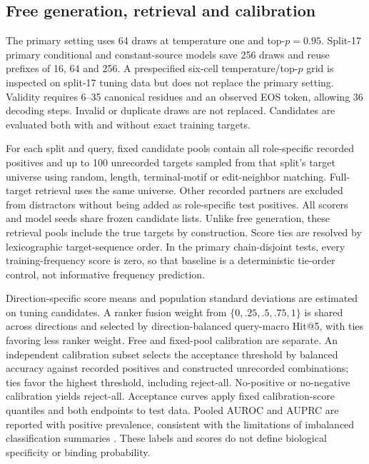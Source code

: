 \documentclass[10pt]{article}
\begin{document}
\subsection{Free generation, retrieval and calibration}
The primary setting uses 64 draws at temperature one and top-$p=0.95$.
Split-17 primary conditional and constant-source models save 256 draws and
reuse prefixes of 16, 64 and 256. A prespecified six-cell temperature/top-$p$
grid is inspected on split-17 tuning data but does not replace the primary
setting. Validity requires 6--35 canonical residues and an observed EOS token,
allowing 36 decoding steps. Invalid or duplicate draws are not replaced.
Candidates are evaluated both with and without exact training targets.

For each split and query, fixed candidate pools contain all role-specific
recorded positives and up to 100 unrecorded targets sampled from that split's
target universe using random, length, terminal-motif or edit-neighbor matching.
Full-target retrieval uses the same universe. Other recorded partners are
excluded from distractors without being added as role-specific test positives.
All scorers and model seeds share frozen candidate lists. Unlike free generation,
these retrieval pools include the true targets by construction.
Score ties are resolved by lexicographic target-sequence order. In the primary
chain-disjoint tests, every training-frequency score is zero, so that baseline
is a deterministic tie-order control, not informative frequency prediction.

Direction-specific score means and population standard deviations are estimated
on tuning candidates. A ranker fusion weight from $\{0,.25,.5,.75,1\}$ is shared
across directions and selected by direction-balanced query-macro Hit@5, with
ties favoring less ranker weight. Free and fixed-pool calibration are separate.
An independent calibration subset selects the acceptance threshold by balanced
accuracy against recorded positives and constructed unrecorded combinations;
ties favor the highest threshold, including reject-all. No-positive or
no-negative calibration yields reject-all. Acceptance curves apply fixed
calibration-score quantiles and both endpoints to test data. Pooled AUROC and
AUPRC are reported with positive prevalence, consistent with the limitations of
imbalanced classification summaries \cite{pr_metrics}. These labels and scores
do not define biological specificity or binding probability.
\end{document}
